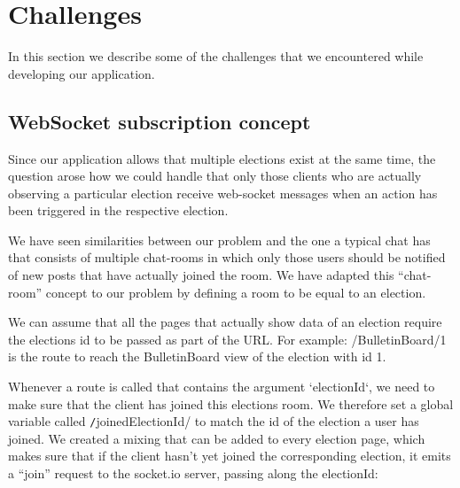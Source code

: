 \section{Challenges}
In this section we describe some of the challenges that we encountered while developing our application.

\subsection{WebSocket subscription concept}
Since our application allows that multiple elections exist at the same time, the question arose how we could handle that only those clients who are actually observing a particular election receive web-socket messages when an action has been triggered in the respective election.

We have seen similarities between our problem and the one a typical chat has that consists of multiple chat-rooms in which only those users should be notified of new posts that have actually joined the room. We have adapted this "`chat-room"' concept to our problem by defining a room to be equal to an election.

We can assume that all the pages that actually show data of an election require the elections id to be passed as part of the URL. For example: /BulletinBoard/1 is the route to reach the BulletinBoard view of the election with id 1.

Whenever a route is called that contains the argument `electionId`, we need to make sure that the client has joined this elections room. We therefore set a global variable called \texttt/joinedElectionId/ to match the id of the election a user has joined. We created a mixing that can be added to every election page, which makes sure that if the client hasn't yet joined the corresponding election, it emits a "`join"' request to the socket.io server, passing along the electionId:

